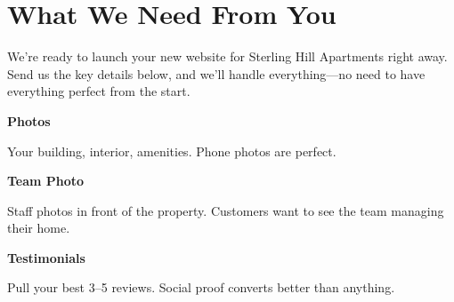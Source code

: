 \documentclass[11pt,letterpaper]{article}
\begin{document}
\vspace{0.2em}

\section*{What We Need From You}

We’re ready to launch your new website for Sterling Hill Apartments right away. Send us the key details below, and we’ll handle everything—no need to have everything perfect from the start.

\vspace{0.12em}

\noindent\begin{minipage}[t]{0.48\textwidth}
\begin{tcolorbox}[colframe=accent-teal, boxrule=1pt, left=0.7em, right=0.7em, top=0.5em, bottom=0.5em, arc=4pt, boxsep=0pt]
{\bfseries\small\color{accent-teal}Photos}

\vspace{0.15em}

{\small Your building, interior, amenities. Phone photos are perfect.}
\end{tcolorbox}

\vspace{0.1em}

\begin{tcolorbox}[colframe=accent-teal, boxrule=1pt, left=0.7em, right=0.7em, top=0.5em, bottom=0.5em, arc=4pt, boxsep=0pt]
{\bfseries\small\color{accent-teal}Team Photo}

\vspace{0.15em}

{\small Staff photos in front of the property. Customers want to see the team managing their home.}
\end{tcolorbox}

\vspace{0.1em}

\begin{tcolorbox}[colframe=accent-teal, boxrule=1pt, left=0.7em, right=0.7em, top=0.5em, bottom=0.5em, arc=4pt, boxsep=0pt]
{\bfseries\small\color{accent-teal}Testimonials}

\vspace{0.15em}

{\small Pull your best 3--5 reviews. Social proof converts better than anything.}
\end{tcolorbox}
\end{minipage}
\hfill
\end{document}

